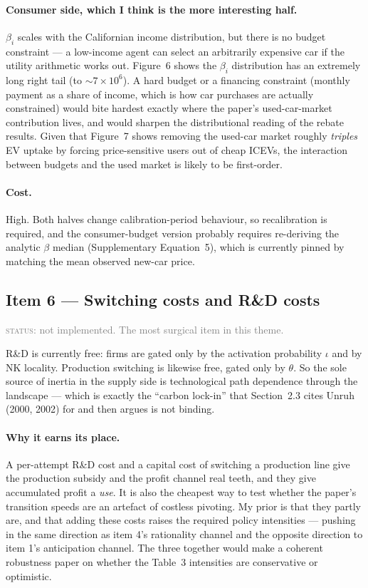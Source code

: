 \documentclass[11pt]{article}
\newcommand{\status}[1]{\textcolor{gray}{\textsc{status:} #1}}
\begin{document}
\paragraph{Consumer side, which I think is the more interesting half.}
$\beta_i$ scales with the Californian income distribution, but there is no
budget constraint --- a low-income agent can select an arbitrarily expensive
car if the utility arithmetic works out. Figure~6 shows the $\beta_i$
distribution has an extremely long right tail (to $\sim 7\times 10^6$). A
hard budget or a financing constraint (monthly payment as a share of
income, which is how car purchases are actually constrained) would bite
hardest exactly where the paper's used-car-market contribution lives, and
would sharpen the distributional reading of the rebate results. Given that
Figure~7 shows removing the used-car market roughly \emph{triples} EV
uptake by forcing price-sensitive users out of cheap ICEVs, the interaction
between budgets and the used market is likely to be first-order.

\paragraph{Cost.} High. Both halves change calibration-period behaviour, so
recalibration is required, and the consumer-budget version probably requires
re-deriving the analytic $\beta$ median (Supplementary Equation~5), which is
currently pinned by matching the mean observed new-car price.

\subsection{Item 6 --- Switching costs and R\&D costs}

\status{not implemented. The most surgical item in this theme.}

R\&D is currently free: firms are gated only by the activation probability
$\iota$ and by NK locality. Production switching is likewise free, gated
only by $\theta$. So the sole source of inertia in the supply side is
technological path dependence through the landscape --- which is exactly the
``carbon lock-in'' that Section~2.3 cites Unruh (2000, 2002) for and then
argues is not binding.

\paragraph{Why it earns its place.} A per-attempt R\&D cost and a
capital cost of switching a production line give the production subsidy and
the profit channel real teeth, and they give accumulated profit a
\emph{use}. It is also the cheapest way to test whether the paper's
transition speeds are an artefact of costless pivoting. My prior is that
they partly are, and that adding these costs raises the required policy
intensities --- pushing in the same direction as item 4's rationality
channel and the opposite direction to item 1's anticipation channel. The
three together would make a coherent robustness paper on whether the
Table~3 intensities are conservative or optimistic.
\end{document}
